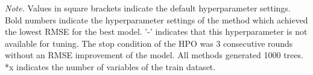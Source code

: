 \documentclass[12pt,a4paper]{article}
\begin{document}
\begin{table}[!htbp]
\begin{threeparttable}
\begin{tabular}{*{6}{l}}
\\
        \bottomrule
     \end{tabular}
    \begin{tablenotes}[flushleft]
      \small
      \item \textit{Note.} Values in square brackets indicate the default hyperparameter settings. Bold numbers indicate the hyperparameter settings of the method which achieved the lowest RMSE for the best model. '-' indicates that this hyperparameter is not available for tuning. The stop condition of the HPO was 3 consecutive rounds without an RMSE improvement of the model. All methods generated 1000 trees. *x indicates the number of variables of the train dataset. 
    \end{tablenotes}
      \label{tab:HPO_results_best_mod}
  \end{threeparttable}
\end{table}

\newcommand{\hlfancy}[2]{\sethlcolor{#1}\hl{#2}}
\end{document}
